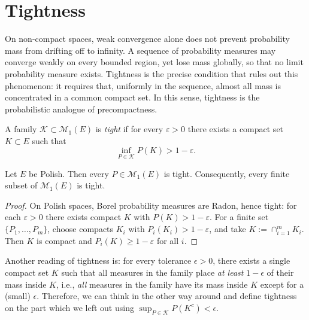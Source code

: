\chapter{Tightness}

On non-compact spaces, weak convergence alone does not prevent probability mass from drifting off to infinity.
A sequence of probability measures may converge weakly on every bounded region, yet lose mass globally, so that no limit probability measure exists.
Tightness is the precise condition that rules out this phenomenon: it requires that, uniformly in the sequence, almost all mass is concentrated in a common compact set.
In this sense, tightness is the probabilistic analogue of precompactness.

\begin{definition}[Tightness]\label{def:tightness}
A family $\mathcal{K}\subset\mathcal{M}_1(E)$ is \emph{tight} if for every $\varepsilon>0$ there exists a compact set $K\subset E$ such that
\[
\inf_{P\in\mathcal{K}} P(K) > 1-\varepsilon.
\]
\end{definition}

\begin{lemma}
Let $E$ be Polish. Then every $P\in\mathcal{M}_1(E)$ is tight. Consequently, every finite subset of $\mathcal{M}_1(E)$ is tight.
\end{lemma}

\begin{proof}
On Polish spaces, Borel probability measures are Radon, hence tight: for each $\varepsilon>0$ there exists compact $K$ with $P(K)>1-\varepsilon$.
For a finite set $\{P_1,\dots,P_m\}$, choose compacts $K_i$ with $P_i(K_i)>1-\varepsilon$, and take $K:=\cap_{i=1}^m K_i$.
Then $K$ is compact and $P_i(K)\ge 1-\varepsilon$ for all $i$.
\end{proof}

\begin{remark}
    Another reading of tightness is: for every tolerance $\epsilon > 0$, there exists a single compact set $K$ such that all measures in the family place \emph{at least} $1-\epsilon$ of their mass inside $K$, i.e., \emph{all} measures in the family have its mass inside $K$ except for a (small) $\epsilon$. Therefore, we can think in the other way around and define tightness on the part which we left out using $\sup_{P\in\mathcal{K}}P(K^c) < \epsilon$.
\end{remark}

\medskip

